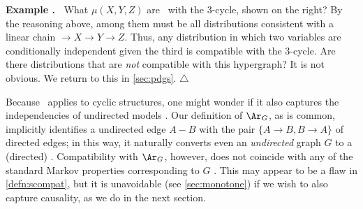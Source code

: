 \newlength{\cycleboxlen}
\newsavebox\cyclebox
\sbox{}
\settowidth{\cycleboxlen}{\usebox{\cyclebox}}
\addtolength{\cycleboxlen}{1em}
\begin{wrapfigure}[4]{o}{\cycleboxlen}
    \vspace{-0.8em}
    \hfill
    \usebox\cyclebox
\end{wrapfigure}
\label{example:xyz-cycle-1}
\textbf{Example {\theexample}.~} 
    What $\mu(X,Y,Z)$ are \cible\ with the 3-cycle, shown on the right?
    By the reasoning above,
     among them must be all distributions consistent with a linear chain ${\to}X{\to}Y{\to}Z$. Thus,  
    any distribution in which two variables are conditionally independent given the third is compatible with the 3-cycle.
    Are there
    distributions that are \emph{not} compatible with 
    this hypergraph? It is not obvious. We return to this
     in \cref{sec:pdgs}. 
\hfill$\triangle$



Because \scibility\ applies to cyclic structures,  one might wonder if
    it also captures the independencies of undirected models 
    \unskip.
Our definition of $\Ar_G$, as is common, implicitly identifies a undirected edge $A {-} B$ with the pair $\{ A{\to}B, B{\to}A\}$ of directed edges;
in this way, it naturally converts even an \emph{undirected} graph $G$ to a (directed) \hgraph. 
Compatibility with $\Ar_G$, however, does not coincide with any of the standard Markov properties
corresponding to $G$ \citep{koller2009probabilistic}.
This may appear to be a flaw in \cref{defn:scompat},
but it is unavoidable (see \cref{sec:monotone}) if we wish to also capture causality, as we do in the next section. 


